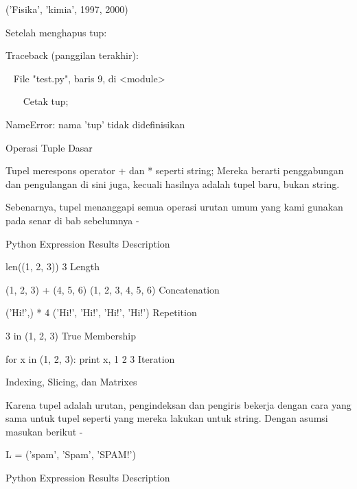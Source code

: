 ('Fisika', 'kimia', 1997, 2000) \par
Setelah menghapus tup: \par
Traceback (panggilan terakhir): \par
~ File "test.py", baris 9, di <module> \par
~~~ Cetak tup; \par
NameError: nama 'tup' tidak didefinisikan \par
Operasi Tuple Dasar \par
Tupel merespons operator + dan * seperti string; Mereka berarti penggabungan dan pengulangan di sini juga, kecuali hasilnya adalah tupel baru, bukan string. \par
Sebenarnya, tupel menanggapi semua operasi urutan umum yang kami gunakan pada senar di bab sebelumnya - \par
Python Expression \hspace*{0.5in} Results  \hspace*{0.5in} Description \par
len((1, 2, 3)) \hspace*{0.5in} 3 \hspace*{0.5in} Length \par
(1, 2, 3) + (4, 5, 6) \hspace*{0.5in} (1, 2, 3, 4, 5, 6) \hspace*{0.5in} Concatenation \par
('Hi!',) * 4 \hspace*{0.5in} ('Hi!', 'Hi!', 'Hi!', 'Hi!') \hspace*{0.5in} Repetition \par
3 in (1, 2, 3) \hspace*{0.5in} True \hspace*{0.5in} Membership \par
for x in (1, 2, 3): print x, \hspace*{0.5in} 1 2 3 \hspace*{0.5in} Iteration \par
Indexing, Slicing, dan Matrixes \par
Karena tupel adalah urutan, pengindeksan dan pengiris bekerja dengan cara yang sama untuk tupel seperti yang mereka lakukan untuk string. Dengan asumsi masukan berikut - \par
L = ('spam', 'Spam', 'SPAM!') \par
  \par
Python Expression \hspace*{0.5in} Results  \hspace*{0.5in} Description \par
